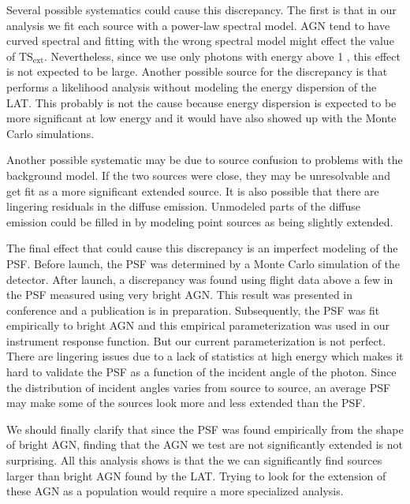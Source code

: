 \documentclass[12pt,preprint]{aastex}
\newcommand{\gev}{\text{GeV}\xspace}
\newcommand{\tsext}{{\ensuremath{\text{TS}_\text{ext}}}\xspace}
\newcommand{\pointlike}{\text{\em pointlike}\xspace}
\begin{document}
Several possible systematics could cause this discrepancy. The first is
that in our analysis we fit each source with a power-law spectral model.
AGN tend to have curved spectral and fitting with the wrong spectral
model might effect the value of \tsext. Nevertheless, since we use only
photons with energy above 1 \gev, this effect is not expected to be large.
Another possible source for the discrepancy is that \pointlike performs
a likelihood analysis without modeling the energy dispersion of the LAT.
This probably is not the cause because energy dispersion is expected to
be more significant at low energy and it would have also showed up with
the Monte Carlo simulations.

Another possible systematic may be due to source confusion to problems
with the background model. If the two sources were close,
they may be unresolvable and get fit as a more significant extended source.
It is also possible that there are lingering
residuals in the diffuse emission. Unmodeled parts of the diffuse
emission could be filled in by modeling point sources as being slightly extended.

The final effect that could cause this discrepancy is an imperfect
modeling of the PSF.  Before launch, the PSF
was determined by a Monte Carlo simulation of the detector.
After launch, a discrepancy was found using flight data above a
few \gev in the PSF measured using very bright AGN.  This result
was presented in conference and a publication is in preparation.
Subsequently, the PSF was fit empirically to bright AGN and this
empirical parameterization was used in our instrument
response function.
But our current parameterization is not perfect. There are lingering
issues due to a lack of statistics at high energy which makes it hard to
validate the PSF as a function of the incident angle of the photon. Since
the distribution of incident angles varies from source to source, an
average PSF may make some of the sources look more and less extended
than the PSF.

We should finally clarify that since the PSF was found empirically
from the shape of bright AGN, finding that the AGN we test are not
significantly extended is not surprising.  All this analysis shows
is that the we can significantly find sources larger than bright AGN
found by the LAT.  Trying to look for the extension of these AGN as a
population would require a more specialized analysis.
\end{document}
